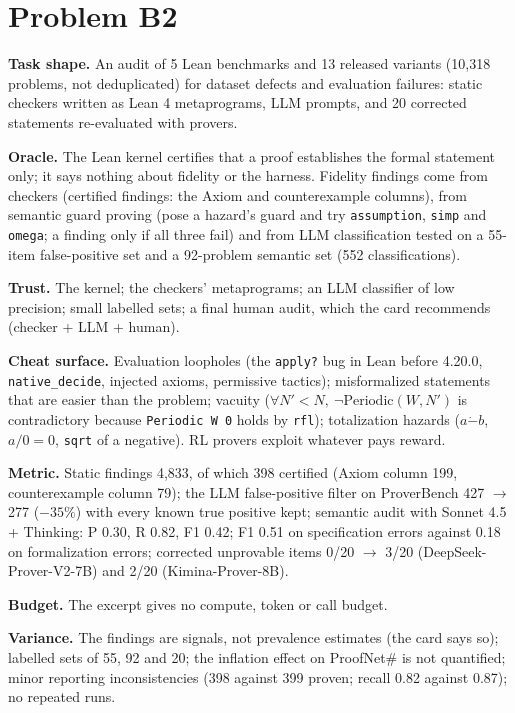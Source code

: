 \documentclass[11pt]{article}
\begin{document}
\section*{Problem B2}\label{ans:B2}
\begin{answer}
\textbf{Task shape.} An audit of 5 Lean benchmarks and 13 released variants
(10,318 problems, not deduplicated) for dataset defects and evaluation
failures: static checkers written as Lean 4 metaprograms, LLM prompts, and 20
corrected statements re-evaluated with provers.

\textbf{Oracle.} The Lean kernel certifies that a proof establishes the formal
statement only; it says nothing about fidelity or the harness. Fidelity
findings come from checkers (certified findings: the Axiom and counterexample
columns), from semantic guard proving (pose a hazard's guard and try
\texttt{assumption}, \texttt{simp} and \texttt{omega}; a finding only if all
three fail) and from LLM classification tested on a 55-item false-positive set
and a 92-problem semantic set (552 classifications).

\textbf{Trust.} The kernel; the checkers' metaprograms; an LLM classifier of
low precision; small labelled sets; a final human audit, which the card
recommends (checker + LLM + human).

\textbf{Cheat surface.} Evaluation loopholes (the \texttt{apply?} bug in Lean
before 4.20.0, \texttt{native\_decide}, injected axioms, permissive tactics);
misformalized statements that are easier than the problem; vacuity
($\forall N'<N,\ \neg\mathrm{Periodic}(W,N')$ is contradictory because
\texttt{Periodic W 0} holds by \texttt{rfl}); totalization hazards
($a\mathbin{\dot-}b$, $a/0=0$, \texttt{sqrt} of a negative). RL provers exploit
whatever pays reward.

\textbf{Metric.} Static findings 4,833, of which 398 certified (Axiom column
199, counterexample column 79); the LLM false-positive filter on ProverBench
427 $\to$ 277 ($-35\%$) with every known true positive kept; semantic audit
with Sonnet 4.5 + Thinking: P 0.30, R 0.82, F1 0.42; F1 0.51 on specification
errors against 0.18 on formalization errors; corrected unprovable items 0/20
$\to$ 3/20 (DeepSeek-Prover-V2-7B) and 2/20 (Kimina-Prover-8B).

\textbf{Budget.} The excerpt gives no compute, token or call budget.

\textbf{Variance.} The findings are signals, not prevalence estimates
(the card says so); labelled sets of 55, 92 and 20; the inflation effect on
ProofNet\# is not quantified; minor reporting inconsistencies (398 against 399
proven; recall 0.82 against 0.87); no repeated runs.


\end{answer}
\end{document}
